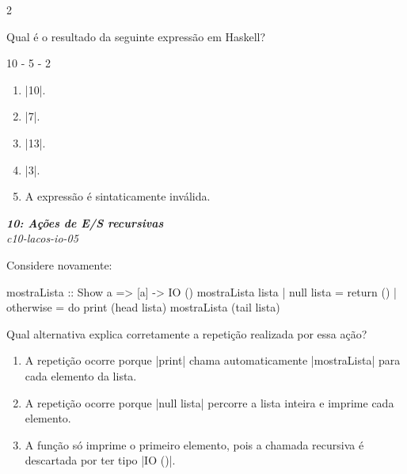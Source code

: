 \documentclass[a4paper,10pt,brazil]{article}
\begin{document}
\begin{multicols}{2}
\begin{flushright}
\end{flushright}
Qual é o resultado da seguinte expressão em Haskell?

\begin{haskellcode}
10 - 5 - 2
\end{haskellcode}

\begin{enumerate}
  \item \haskellinline|10|.

  \item \haskellinline|7|.

  \item \haskellinline|13|.

  \item \haskellinline|3|.

  \item A expressão é sintaticamente inválida.


\end{enumerate}

\begin{flushright}
  \footnotesize
  \textit{\textbf{10: Ações de E/S recursivas}}\\
  \textit{c10-lacos-io-05}\\

\end{flushright}
Considere novamente:

\begin{haskellcode}
mostraLista :: Show a => [a] -> IO ()
mostraLista lista
  | null lista = return ()
  | otherwise = do
      print (head lista)
      mostraLista (tail lista)
\end{haskellcode}

Qual alternativa explica corretamente a repetição realizada por essa ação?

\begin{enumerate}
  \item A repetição ocorre porque \haskellinline|print| chama automaticamente \haskellinline|mostraLista| para cada elemento da lista.

  \item A repetição ocorre porque \haskellinline|null lista| percorre a lista inteira e imprime cada elemento.

  \item A função só imprime o primeiro elemento, pois a chamada recursiva é descartada por ter tipo \haskellinline|IO ()|.


\end{enumerate}
\end{multicols}
\end{document}
